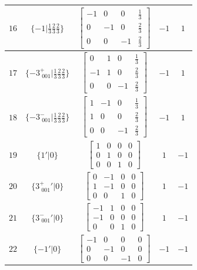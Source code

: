 \documentclass[fleqn,8pt]{jsarticle}
\begin{document}
\begin{longtable}{ccccc}
$ 16 $ & $ \{-1|\frac{1}{3} \frac{2}{3} \frac{2}{3}\} $ & $ \begin{bmatrix} -1 & 0 & 0 & \frac{1}{3} \\ 0 & -1 & 0 & \frac{2}{3} \\ 0 & 0 & -1 & \frac{2}{3} \end{bmatrix} $ & $ -1 $ & $ 1 $ \\ \hline
$ 17 $ & $ \{-3^{+}_{\,\,001}|\frac{1}{3} \frac{2}{3} \frac{2}{3}\} $ & $ \begin{bmatrix} 0 & 1 & 0 & \frac{1}{3} \\ -1 & 1 & 0 & \frac{2}{3} \\ 0 & 0 & -1 & \frac{2}{3} \end{bmatrix} $ & $ -1 $ & $ 1 $ \\ \hline
$ 18 $ & $ \{-3^{-}_{\,\,001}|\frac{1}{3} \frac{2}{3} \frac{2}{3}\} $ & $ \begin{bmatrix} 1 & -1 & 0 & \frac{1}{3} \\ 1 & 0 & 0 & \frac{2}{3} \\ 0 & 0 & -1 & \frac{2}{3} \end{bmatrix} $ & $ -1 $ & $ 1 $ \\ \hline
$ 19 $ & $ \{1{}'|0\} $ & $ \begin{bmatrix} 1 & 0 & 0 & 0 \\ 0 & 1 & 0 & 0 \\ 0 & 0 & 1 & 0 \end{bmatrix} $ & $ 1 $ & $ -1 $ \\ \hline
$ 20 $ & $ \{3^{+}_{\,\,001}{}'|0\} $ & $ \begin{bmatrix} 0 & -1 & 0 & 0 \\ 1 & -1 & 0 & 0 \\ 0 & 0 & 1 & 0 \end{bmatrix} $ & $ 1 $ & $ -1 $ \\ \hline
$ 21 $ & $ \{3^{-}_{\,\,001}{}'|0\} $ & $ \begin{bmatrix} -1 & 1 & 0 & 0 \\ -1 & 0 & 0 & 0 \\ 0 & 0 & 1 & 0 \end{bmatrix} $ & $ 1 $ & $ -1 $ \\ \hline
$ 22 $ & $ \{-1{}'|0\} $ & $ \begin{bmatrix} -1 & 0 & 0 & 0 \\ 0 & -1 & 0 & 0 \\ 0 & 0 & -1 & 0 \end{bmatrix} $ & $ -1 $ & $ -1 $ \\ \hline

\end{longtable}
\end{document}
